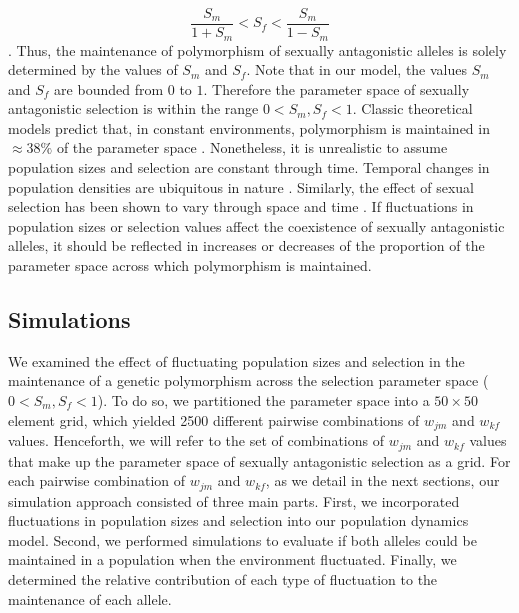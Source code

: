 \begin{refsection}
\begin{equation}
\frac{S_{m}}{1+S_{m}} < S_{f} < \frac{S_{m}}{1-S_{m}}
\label{selection}
\end{equation}
\citep{kidwell1977regions,pamilo1979genic,patten2010fitness,connallon2018environmental}. Thus, the maintenance of polymorphism of sexually antagonistic alleles is solely determined by the values of $S_{m}$ and $S_{f}$. Note that in our model, the values $S_{m}$ and $S_{f}$ are bounded from $0$ to $1$. Therefore the parameter space of sexually antagonistic selection is within the range $ 0< S_{m}, S_{f} < 1$. Classic theoretical models predict that, in constant environments, polymorphism is maintained in $\approx 38\%$ of the parameter space \citep{kidwell1977regions,pamilo1979genic,connallon_evolutionary_2019}. Nonetheless, it is unrealistic to assume population sizes and selection are constant through time. Temporal changes in population densities are ubiquitous in nature \citep{whitlock1992temporal,connallon2012general,reinhold2000maintenance}. Similarly, the effect of sexual selection has been shown to vary through space and time \citep{kasumovic2008spatial}. If fluctuations in population sizes or selection values affect the coexistence of sexually antagonistic alleles, it should be reflected in increases or decreases of the proportion of the parameter space across which polymorphism is maintained.


\subsection*{Simulations}
We examined the effect of fluctuating population sizes and selection in the maintenance of a genetic polymorphism across the selection parameter space ($0 < S_{m}, S_{f} < 1$). To do so, we partitioned the parameter space into a $50 \times 50$ element grid, which yielded 2500 different pairwise combinations of $w_{jm}$ and $w_{kf}$ values. Henceforth, we will refer to the set of combinations of $w_{jm}$ and $w_{kf}$ values that make up the parameter space of sexually antagonistic selection as a grid. For each pairwise combination of $w_{jm}$ and $w_{kf}$, as we detail in the next sections, our simulation approach consisted of three main parts. First, we incorporated fluctuations in population sizes and selection into our population dynamics model. Second, we performed simulations to evaluate if both alleles could be maintained in a population when the environment fluctuated. Finally, we determined the relative contribution of each type of fluctuation to the maintenance of each allele.


\end{refsection}
